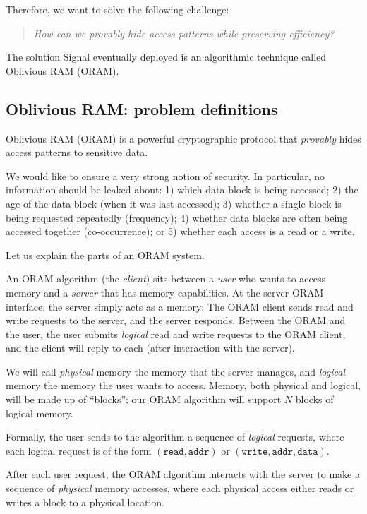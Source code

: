 Therefore, we want to solve the following challenge:

\begin{quote}
{\it How can we provably hide access patterns while preserving efficiency?}
\end{quote}

The solution Signal eventually deployed is an algorithmic technique
called Oblivious RAM (ORAM).

\subsection{Oblivious RAM: problem
definitions}
\label{oblivious-ram-problem-definitions}

Oblivious RAM (ORAM) is a powerful cryptographic protocol that
\emph{provably} hides access patterns to sensitive data.

We would like to ensure a very strong notion of security. In particular,
no information should be leaked about: 1) which data block is being
accessed; 2) the age of the data block (when it was last accessed); 3)
whether a single block is being requested repeatedly (frequency); 4)
whether data blocks are often being accessed together (co-occurrence);
or 5) whether each access is a read or a write.

Let us explain the parts of an ORAM system.

An ORAM algorithm (the \emph{client}) sits between a \emph{user} who
wants to access memory and a \emph{server} that has memory capabilities.
At the server-ORAM interface, the server simply acts as a memory: The
ORAM client sends read and write requests to the server, and the server
responds. Between the ORAM and the user, the user submits \emph{logical}
read and write requests to the ORAM client, and the client will reply to
each (after interaction with the server).

We will call \emph{physical} memory the memory that the server manages,
and \emph{logical} memory the memory the user wants to access. Memory,
both physical and logical, will be made up of ``blocks''; our ORAM
algorithm will support \(N\) blocks of logical memory.

Formally, the user sends to the algorithm a sequence of \emph{logical}
requests, where each logical request is of the form
\((\texttt{read},\texttt{addr})\) or
\((\texttt{write}, \texttt{addr}, \texttt{data})\).

After each user request, the ORAM algorithm interacts with the server to
make a sequence of \emph{physical} memory accesses, where each physical
access either reads or writes a block to a physical location.

